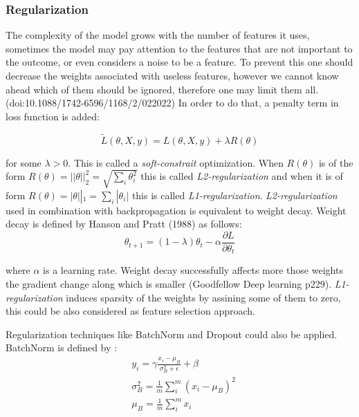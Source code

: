 \subsubsection{Regularization}

The complexity of the model grows with the number of features it uses, sometimes the model may pay attention to the features that are not important to the outcome, or even considers a noise to be a feature. To prevent this one should decrease the weights associated with useless features, however we cannot know ahead which of them should be ignored, therefore one may limit them all. (doi:10.1088/1742-6596/1168/2/022022) In order to do that, a penalty term in loss function is added:

\begin{equation}
   \tilde{L}(\theta, X, y) = L(\theta, X, y) + \lambda R(\theta)
\end{equation}

for some $\lambda > 0$. This is called a \emph{soft-constrait} optimization. When $R(\theta)$ is of the form $R(\theta) = ||\theta||^2_2 = \sqrt{\sum_i \theta_i^2}$ this is called \emph{L2-regularization} and when it is of form $R(\theta) = |\theta||_1 = \sum_i |\theta_i|$ this is called \emph{L1-regularization}. \emph{L2-regularization} used in combination with backpropagation is equivalent to weight decay. Weight decay is defined by Hanson and Pratt (1988) as follows:
\begin{equation}
    \theta_{t+1} = (1 - \lambda)\theta_t - \alpha \frac{\partial L}{\partial \theta_t}
\end{equation}

where $\alpha$ is a learning rate. Weight decay successfully affects more those weights the gradient change along which is smaller (Goodfellow Deep learning p229). \emph{L1-regularization} induces sparsity of the weights by assining some of them to zero, this could be also considered as feature selection approach.

Regularization techniques like BatchNorm and Dropout could also be applied. BatchNorm is defined by :
\begin{equation}
    \begin{split}
    & y_i = \gamma \frac{x_i - \mu_B}{\sigma^2_B + \epsilon} + \beta \\
    & \sigma^2_B = \frac{1}{m} \sum_i^m (x_i - \mu_B)^2 \\
    & \mu_B = \frac{1}{m} \sum_i^m x_i \\
    \end{split}
\end{equation}

